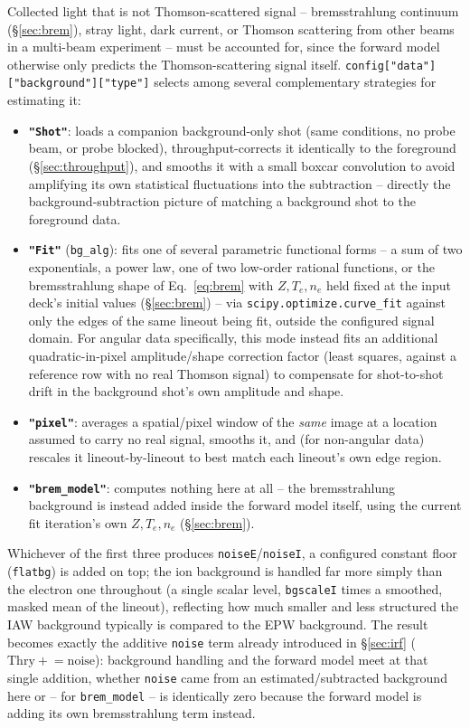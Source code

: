 \documentclass[11pt]{article}
\newcommand{\code}[1]{\texttt{#1}}
\begin{document}
Collected light that is not Thomson-scattered signal -- bremsstrahlung continuum
(\S\ref{sec:brem}), stray light, dark current, or Thomson scattering from other beams in a
multi-beam experiment -- must be accounted for, since the forward model otherwise only
predicts the Thomson-scattering signal itself. \code{config["data"]["background"]["type"]}
selects among several complementary strategies for estimating it:
\begin{itemize}
  \item \textbf{\code{"Shot"}}: loads a companion background-only shot (same conditions,
    no probe beam, or probe blocked), throughput-corrects it identically to the foreground
    (\S\ref{sec:throughput}), and smooths it with a small boxcar convolution to avoid
    amplifying its own statistical fluctuations into the subtraction -- directly the
    background-subtraction picture of matching a background shot to the foreground data.
  \item \textbf{\code{"Fit"}} (\code{bg\_alg}): fits one of several parametric functional
    forms -- a sum of two exponentials, a power law, one of two low-order rational
    functions, or the bremsstrahlung shape of Eq.~\ref{eq:brem} with $Z,T_e,n_e$ held fixed
    at the input deck's initial values (\S\ref{sec:brem}) -- via
    \code{scipy.optimize.curve\_fit} against only the edges of the same lineout being fit,
    outside the configured signal domain. For angular data specifically, this mode instead
    fits an additional quadratic-in-pixel amplitude/shape correction factor (least squares,
    against a reference row with no real Thomson signal) to compensate for shot-to-shot
    drift in the background shot's own amplitude and shape.
  \item \textbf{\code{"pixel"}}: averages a spatial/pixel window of the \emph{same} image at
    a location assumed to carry no real signal, smooths it, and (for non-angular data)
    rescales it lineout-by-lineout to best match each lineout's own edge region.
  \item \textbf{\code{"brem\_model"}}: computes nothing here at all -- the bremsstrahlung
    background is instead added inside the forward model itself, using the current fit
    iteration's own $Z,T_e,n_e$ (\S\ref{sec:brem}).
\end{itemize}
Whichever of the first three produces \code{noiseE}/\code{noiseI}, a configured constant
floor (\code{flatbg}) is added on top; the ion background is handled far more simply than
the electron one throughout (a single scalar level, \code{bgscaleI} times a smoothed,
masked mean of the lineout), reflecting how much smaller and less structured the IAW
background typically is compared to the EPW background. The result becomes exactly the
additive \code{noise} term already introduced in \S\ref{sec:irf}
($\mathrm{Thry}\mathrel{+}=\mathrm{noise}$): background handling and the forward model meet
at that single addition, whether \code{noise} came from an estimated/subtracted background
here or -- for \code{brem\_model} -- is identically zero because the forward model is
adding its own bremsstrahlung term instead.
\end{document}
